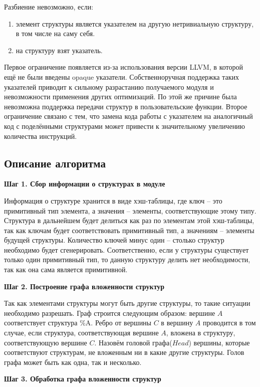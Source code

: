 Разбиение невозможно, если:
\begin{enumerate}
\item элемент структуры является указателем на другую нетривиальную структуру, в том числе на саму себя.
\item на структуру взят указатель.
\end{enumerate}

Первое ограничение появляется из-за использования версии LLVM, в которой ещё не были введены opaque указатели.
Собственноручная поддержка таких указателей приводит к сильному разрастанию получаемого модуля и невозможности применения других оптимизаций.
По этой же причине была невозможна поддержка передачи структур в пользовательские функции.
Второе ограничение связано с тем, что замена кода работы с указателем на аналогичный код с поделёнными структурами может привести к значительному увеличению количества инструкций.

\subsection{Описание алгоритма}\label{subsec:lowering/splitter/algorithm}

\textbf{Шаг 1. Сбор информации о структурах в модуле}

Информация о структуре хранится в виде хэш-таблицы, где ключ -- это примитивный тип элемента, а значения -- элементы, соответствующие этому типу. Структура в дальнейшем будет делиться как раз по элементам этой хэш-таблицы, так как ключам будет соответствовать примитивный тип, а значениям -- элементы будущей структуры. 
Количество ключей минус один -- столько структур необходимо будет сгенерировать.
Соответственно, если у структуры существует только один примитивный тип, то данную структуру делить нет необходимости, так как она сама является примитивной.

\textbf{Шаг 2. Построение графа вложенности структур}

Так как элементами структуры могут быть другие структуры, то такие ситуации необходимо разрешать.
Граф строится следующим образом: вершине $A$ соответствует структура \%A.
Ребро от вершины $C$ в вершину $A$ проводится в том случае, если структура, соответствующая вершине $A$, вложена в структуру, соответствующую вершине $C$.
Назовём головой графа($Head$) вершины, которые соответствуют структурам, не вложенным ни в какие другие структуры.
Голов графа может быть как одна, так и несколько.

\textbf{Шаг 3. Обработка графа вложенности структур}

